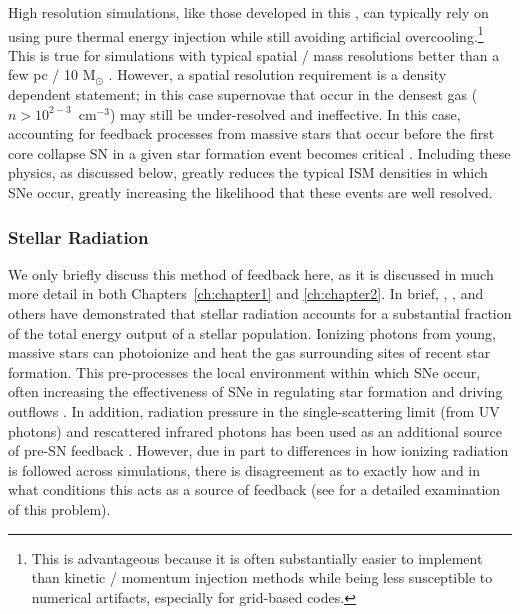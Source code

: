 High resolution simulations, like those developed in this \dissertation, can typically rely on using pure thermal energy injection while still avoiding artificial overcooling.\footnote{This is advantageous because it is often substantially easier to implement than kinetic / momentum injection methods while being less susceptible to numerical artifacts, especially for grid-based codes.} This is true for simulations with typical spatial / mass resolutions better than a few pc / 10 M$_{\odot}$ \citep{Simpson2015,Hu2018,Smith2018b}. However, a spatial resolution requirement is a density dependent statement; in this case supernovae that occur in the densest gas ($n > 10^{2-3}$~cm$^{-3}$) may still be under-resolved and ineffective. In this case, accounting for feedback processes from massive stars that occur before the first core collapse SN in a given star formation event becomes critical \citep{Hu2016}. Including these physics, as discussed below, greatly reduces the typical ISM densities in which SNe occur, greatly increasing the likelihood that these events are well resolved.

\subsubsection{Stellar Radiation}
\label{intro:sec:radiation}

We only briefly discuss this method of feedback here, as it is discussed in much more detail in both Chapters~\ref{ch:chapter1} and \ref{ch:chapter2}. In brief, \cite{Leitherer1999}, \cite{Agertz2013}, and others have demonstrated that stellar radiation accounts for a substantial fraction of the total energy output of a stellar population. Ionizing photons from young, massive stars can photoionize and heat the gas surrounding sites of recent star formation. This pre-processes the local environment within which SNe occur, often increasing the effectiveness of SNe in regulating star formation and driving outflows \citep{Hu2016}. In addition, radiation pressure in the single-scattering limit (from UV photons) and rescattered infrared photons has been used as an additional source of pre-SN feedback \citep[e.g.][]{FIRE}. However, due in part to differences in how ionizing radiation is followed across simulations, there is disagreement as to exactly how and in what conditions this acts as a source of feedback (see \cite{Krumholz2018} for a detailed examination of this problem).

